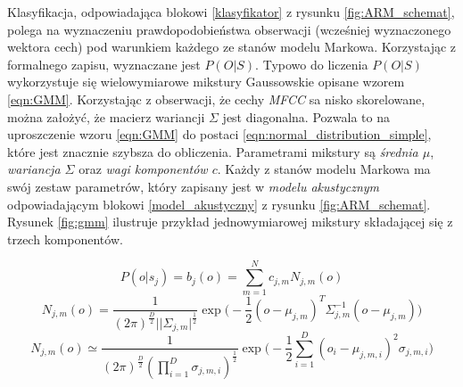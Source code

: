 \documentclass[a4paper,11pt,onecolumn,twoside,openright,titlepage]{article}
\newcommand{\refBlock}[1]{
	\hyperref[#1]{\ref*{#1}}
}
\begin{document}
		Klasyfikacja, odpowiadająca blokowi \refBlock{klasyfikator} z rysunku \ref{fig:ARM_schemat}, polega na wyznaczeniu prawdopodobieństwa obserwacji (wcześniej wyznaczonego wektora cech) pod warunkiem każdego ze stanów modelu Markowa. Korzystając z formalnego zapisu, wyznaczane jest $P(O|S)$. Typowo do liczenia $P(O|S)$ wykorzystuje się wielowymiarowe mikstury Gaussowskie opisane wzorem \ref{eqn:GMM}. Korzystając z obserwacji, że cechy \textit{MFCC} sa nisko skorelowane, można założyć, że macierz wariancji $\Sigma$ jest diagonalna. Pozwala to na uproszczenie wzoru \ref{eqn:GMM} do postaci \ref{eqn:normal_distribution_simple}, które jest znacznie szybsza do obliczenia. Parametrami mikstury są \textit{średnia $\mu$}, \textit{wariancja $\Sigma$} oraz \textit{wagi komponentów $c$}. Każdy z stanów modelu Markowa ma swój zestaw parametrów, który zapisany jest w \textit{modelu akustycznym} odpowiadającym blokowi \refBlock{model_akustyczny} z rysunku \ref{fig:ARM_schemat}. Rysunek \ref{fig:gmm} ilustruje przykład jednowymiarowej mikstury składającej się z trzech komponentów. 
	
		\begin{equation}
			P(o|s_j)=b_j(o) = \sum_{m=1}^N c_{j,m} N_{j,m}(o)
			\label{eqn:GMM}
		\end{equation}
		\begin{equation}
			N_{j,m}(o)=\frac{1}{(2\pi)^{\frac{D}{2}}||\Sigma_{j,m}|^{\frac{1}{2}}}\exp\bigg( -\frac{1}{2}(o-\mu_{j,m})^T\Sigma_{j,m}^{-1}(o-\mu_{j,m}) \bigg)
			\label{eqn:normal_distribution}
		\end{equation}	
		\begin{equation}
			N_{j,m}(o)\simeq\frac{1}{(2\pi)^{\frac{D}{2}}(\prod_{i=1}^D\sigma_{j,m,i})^{\frac{1}{2}}}\exp\bigg( -\frac{1}{2}\sum_{i=1}^D(o_i-\mu_{j,m,i})^2\sigma_{j,m,i} \bigg)
			\label{eqn:normal_distribution_simple}
		\end{equation}
	
\end{document}
